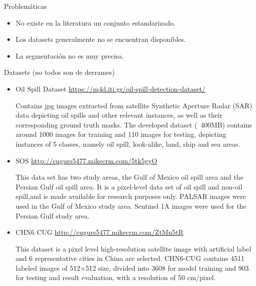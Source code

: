 \begin{frame}{Problemáticas}
    \begin{itemize}
        \item No existe en la literatura un conjunto estandarizado.

        \item Los datasets generalmente no se encuentran disponibles.

        \item La segmentación no es muy precisa.        
    \end{itemize}
\end{frame}

\begin{frame}{Datasets (no todos son de derrames)}
    \footnotesize
    \begin{itemize}
        \item Oil Spill Dataset \href{https://m4d.iti.gr/oil-spill-detection-dataset/}{https://m4d.iti.gr/oil-spill-detection-dataset/}
        
        Contains jpg images extracted from satellite Synthetic Aperture Radar (SAR) data depicting oil spills and other relevant instances, as well as their corresponding ground truth masks. The developed dataset (~400MB) contains around 1000 images for training and 110 images for testing, depicting instances of 5 classes, namely oil spill, look-alike, land, ship and sea areas. \cite{rs11151762}
        
        \item SOS \href{http://cugurs5477.mikecrm.com/5tk5gyO}{http://cugurs5477.mikecrm.com/5tk5gyO}
    
        This data set has two study areas, the Gulf of Mexico oil spill area and the Persian Gulf oil spill area. 
        It is a pixel-level data set of oil spill and non-oil spill,and is made available for research purposes only. 
        PALSAR images were used in the Gulf of Mexico study area. Sentinel 1A images were used for the Persian Gulf study area. \cite{9568691}
        
        \item CHN6 CUG \href{http://cugurs5477.mikecrm.com/ZtMn5tR}{http://cugurs5477.mikecrm.com/ZtMn5tR}
        
        This dataset is a pixel level high-resolution satellite image with artificial label and 6 representative cities in China are selected. CHN6-CUG contains 4511 labeled images of 512×512 size, divided into 3608 for model training and 903 for testing and result evaluation, with a resolution of 50 cm/pixel. \cite{Zhu2021AGC}
    \end{itemize}
\end{frame}
